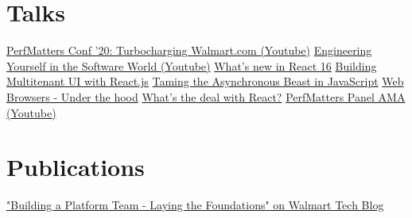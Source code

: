 \documentclass[]{my-resume-openfont}
\begin{document}
\begin{minipage}[t]{0.66\textwidth}

\section{Talks}
\href{https://www.youtube.com/watch?v=vB8JUx9Dp08}{PerfMatters Conf '20: Turbocharging Walmart.com (Youtube)} \textbullet{}
\href{https://www.youtube.com/watch?v=djyUc_-FvYo}{Engineering Yourself in the Software World (Youtube)} \textbullet{}
\href{https://speakerdeck.com/vasa/whats-new-in-react-16}{What's new in React 16} \textbullet{} 
\href{https://speakerdeck.com/vasa/building-multitenant-ui-with-react-dot-js}{Building Multitenant UI with React.js} \textbullet{} 
\href{https://speakerdeck.com/vasa/taming-the-asynchronous-beast-in-javascript}{Taming the Asynchronous Beast in JavaScript} \textbullet{}  \href{https://speakerdeck.com/vasa/web-browsers-under-the-hood}{Web Browsers - Under the hood} \textbullet{}  \href{https://speakerdeck.com/vasa/whats-the-deal-with-react}{What's the deal with React?} \textbullet{} 
\href{https://www.youtube.com/watch?v=9bYQjAuGhr0}{PerfMatters Panel AMA (Youtube)} \\
\sectionsep


\section{Publications}
\href{https://medium.com/walmartglobaltech/building-a-platform-team-d915221d5654}{"Building a Platform Team - Laying the Foundations" on Walmart Tech Blog}
\sectionsep
\end{minipage} 
\end{document}
